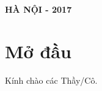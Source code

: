 \documentclass[12pt,a4paper,oneside]{book}
\renewcommand{\baselinestretch}{1.4}
\begin{document}
\begin{titlepage}




\vfill{
\begin{flushright}
\fontsize{17}{0}\textbf{HÀ NỘI - 2017}
\end{flushright}
}
\end{titlepage}
\pagestyle{empty}
\renewcommand{\headrulewidth}{0.4pt}


\pagestyle{fancy}
\lhead{\empty}
\rhead{\empty}
\lfoot{\currfilename}
\chapter*{Mở đầu}
Kính chào các Thầy/Cô.
\end{document}
